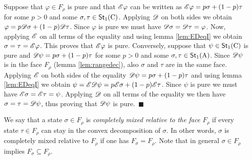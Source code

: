 \documentclass[12pt,aps,pra,showpacs,groupedaddress]{revtex4-1}
\def\Proof{\medskip\par\noindent{\bf Proof. }}
\def\qed{$\,\blacksquare$\par}
\def\rC{{\rm C}}
\def\Stset{{\mathsf{St}}}
\begin{document}
\Proof Suppose that $\varphi \in F_\rho$ is pure and that $\mathscr E
\varphi$ can be written as $\mathscr E \varphi = p \sigma + (1-p) \tau$ for
some $p>0$ and some $\sigma, \tau \in\Stset_1 (\rC)$.  Applying $\mathscr D$
on both sides we obtain $\varphi = p \mathscr D \sigma + (1-p) \mathscr D \tau$.
Since $\varphi$ is pure we must have $\mathscr D \sigma = \mathscr D \tau =
\varphi$.  Now, applying $\mathscr E$ on all terms of the equality and using
lemma \ref{lem:EDeqI} we obtain $\sigma = \tau = \mathscr E \varphi $. This
proves that $\mathscr E\varphi$ is pure.  Conversely, suppose that
$\psi\in\Stset_1(\rC)$ is pure and $\mathscr D \psi = p\sigma + (1-p) \tau$
for some $p>0$ and some $\sigma, \tau\in \Stset_1 (\rA)$. Since $\mathscr D
\psi$ is in the face $F_\rho$ (lemma \ref{lem:rangedec}), also
$\sigma$ and $\tau$ are in the same face.  Applying $\mathscr E$ on both
sides of the equality $\mathscr D \psi = p\sigma + (1-p) \tau$ and using
lemma \ref{lem:EDeqI} we obtain $\psi = \mathscr E \mathscr D \psi = p \mathscr E\sigma
+(1-p) \mathscr E \tau$. Since $\psi$ is pure we must have $\mathscr E \sigma = \mathscr E
\tau = \psi$. Applying $\mathscr D$ on all terms of the equality we then have
$\sigma = \tau = \mathscr D \psi$, thus proving that $\mathscr D \psi$ is pure.
\qed



We say that a state $\sigma \in F_\rho$ is \emph{completely mixed relative to the face $F_\rho$} if
every state $\tau \in F_\rho$ can stay in the convex decomposition of $\sigma$.  In other words,
$\sigma$ is completely mixed relative to $F_\rho$ if one has $F_\sigma = F_\rho$.  Note that in
general $\sigma \in F_\rho$ implies $F_\sigma \subseteq F_\rho$.
\end{document}
